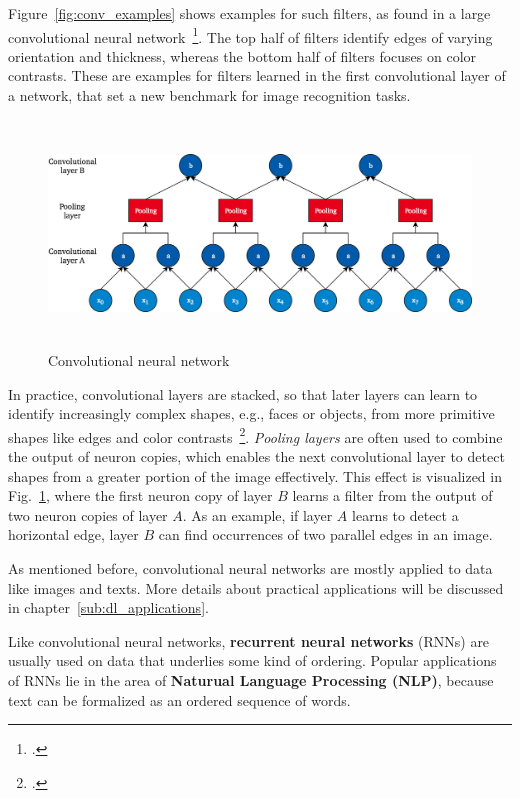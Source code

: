 Figure~\ref{fig:conv_examples} shows examples for such filters, as found in
a large convolutional neural network~\footcite{Krizhevsky2012}.
The top half of filters identify edges of varying orientation and thickness,
whereas the bottom half of filters focuses on color contrasts.
These are examples for filters learned in the first convolutional layer of a
network, that set a new benchmark for image recognition tasks.

\begin{figure}[h]
  \centering
  \includegraphics[height=6cm]{img/conv_architecture}
  \caption{Convolutional neural network}
\label{fig:cnn_architecture}
\end{figure}

In practice, convolutional layers are stacked, so that later layers can learn
to identify increasingly complex shapes, e.g., faces or objects, from more
primitive shapes like edges and color contrasts~\footcite{Simonyan2015}.
\textit{Pooling layers} are often used to combine the output of neuron copies, which
enables the next convolutional layer to detect shapes from a greater portion of
the image effectively.
This effect is visualized in Fig.~\ref{fig:cnn_architecture}, where the first
neuron copy of layer $B$ learns a filter from the output of two neuron copies
of layer $A$.
As an example, if layer $A$ learns to detect a horizontal edge, layer $B$ can
find occurrences of two parallel edges in an image.

As mentioned before, convolutional neural networks are mostly applied to data
like images and texts.
More details about practical applications will be discussed in chapter~\ref{sub:dl_applications}.

Like convolutional neural networks, \textbf{recurrent neural networks} (RNNs) are usually
used on data that underlies some kind of ordering.
Popular applications of RNNs lie in the  area of \textbf{Naturual Language
Processing (NLP)}, because text can be formalized as an ordered sequence of
words.

